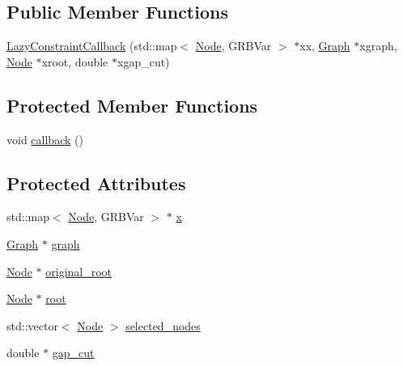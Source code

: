 \subsection*{Public Member Functions}
\begin{DoxyCompactItemize}
\item 
\hyperlink{classderegnet_1_1LazyConstraintCallback_ad025c982974ffc3e70677948b9668600}{Lazy\+Constraint\+Callback} (std\+::map$<$ \hyperlink{namespacederegnet_a744bad34f2de9856d36715a445f027f3}{Node}, G\+R\+B\+Var $>$ $\ast$xx, \hyperlink{namespacederegnet_a55b76c55bbabc682cbc61f8b9948799e}{Graph} $\ast$xgraph, \hyperlink{namespacederegnet_a744bad34f2de9856d36715a445f027f3}{Node} $\ast$xroot, double $\ast$xgap\+\_\+cut)
\end{DoxyCompactItemize}
\subsection*{Protected Member Functions}
\begin{DoxyCompactItemize}
\item 
void \hyperlink{classderegnet_1_1LazyConstraintCallback_ae6cde79cca11b944d25f1533727fd85b}{callback} ()
\end{DoxyCompactItemize}
\subsection*{Protected Attributes}
\begin{DoxyCompactItemize}
\item 
std\+::map$<$ \hyperlink{namespacederegnet_a744bad34f2de9856d36715a445f027f3}{Node}, G\+R\+B\+Var $>$ $\ast$ \hyperlink{classderegnet_1_1LazyConstraintCallback_a48d0e4065232a6dca6e10fe416be755f}{x}
\item 
\hyperlink{namespacederegnet_a55b76c55bbabc682cbc61f8b9948799e}{Graph} $\ast$ \hyperlink{classderegnet_1_1LazyConstraintCallback_af481c9d68dea2dab035e1f2f79cda4d5}{graph}
\item 
\hyperlink{namespacederegnet_a744bad34f2de9856d36715a445f027f3}{Node} $\ast$ \hyperlink{classderegnet_1_1LazyConstraintCallback_a0ced82ab9f112cbb3e1df10a84be6c64}{original\+\_\+root}
\item 
\hyperlink{namespacederegnet_a744bad34f2de9856d36715a445f027f3}{Node} $\ast$ \hyperlink{classderegnet_1_1LazyConstraintCallback_aa4df18debaaf3aaace54a48b0c3e56ca}{root}
\item 
std\+::vector$<$ \hyperlink{namespacederegnet_a744bad34f2de9856d36715a445f027f3}{Node} $>$ \hyperlink{classderegnet_1_1LazyConstraintCallback_a5ddc4662e6e5c9f1d191c15edbefaa9b}{selected\+\_\+nodes}
\item 
double $\ast$ \hyperlink{classderegnet_1_1LazyConstraintCallback_a6a139307165523fa944e393e01aeec47}{gap\+\_\+cut}
\end{DoxyCompactItemize}
